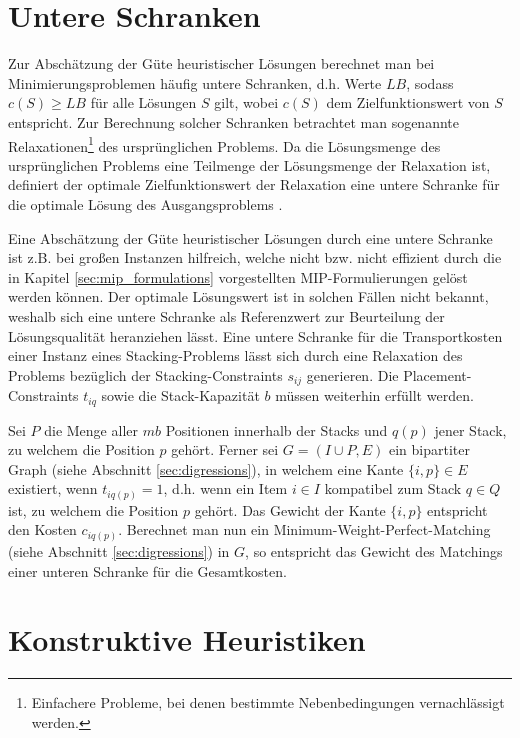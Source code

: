 \section{Untere Schranken}
\label{sec:lower_bounds}

Zur Abschätzung der Güte heuristischer Lösungen berechnet man bei Minimierungsproblemen häufig untere Schranken,
d.h. Werte $LB$, sodass $c(S) \geq LB$ für alle Lösungen $S$ gilt, wobei $c(S)$ dem Zielfunktionswert von $S$ entspricht.
Zur Berechnung solcher Schranken betrachtet man sogenannte Relaxationen\footnote{Einfachere Probleme, bei denen bestimmte Nebenbedingungen vernachlässigt werden.} des ursprünglichen Problems.
Da die Lösungsmenge des ursprünglichen Problems eine Teilmenge der Lösungsmenge der Relaxation ist,
definiert der optimale Zielfunktionswert der Relaxation eine untere Schranke für die optimale Lösung des Ausgangsproblems
\cite{Knust2017}.

Eine Abschätzung der Güte heuristischer Lösungen durch eine untere Schranke ist z.B. bei großen Instanzen hilfreich,
welche nicht bzw. nicht effizient durch die in Kapitel \ref{sec:mip_formulations} vorgestellten MIP-Formulierungen gelöst werden können.
Der optimale Lösungswert ist in solchen Fällen nicht bekannt, weshalb sich eine untere Schranke als Referenzwert
zur Beurteilung der Lösungsqualität heranziehen lässt. Eine untere Schranke für die Transportkosten einer Instanz eines Stacking-Problems lässt sich durch eine Relaxation des Problems bezüglich der Stacking-Constraints $s_{ij}$ generieren.
Die Placement-Constraints $t_{iq}$ sowie die Stack-Kapazität $b$ müssen weiterhin erfüllt werden.

Sei $P$ die Menge aller $mb$ Positionen innerhalb der Stacks und $q(p)$ jener Stack, zu welchem die Position $p$ gehört.
Ferner sei $G = (I \cup P, E)$ ein bipartiter Graph (siehe Abschnitt \ref{sec:digressions}), in welchem eine Kante $\{i, p\} \in E$ existiert, wenn $t_{iq(p)} = 1$, d.h. wenn ein Item $i \in I$ kompatibel zum Stack $q \in Q$ ist, zu welchem die Position $p$ gehört. Das Gewicht der Kante $\{i, p\}$ entspricht den Kosten $c_{iq(p)}$. Berechnet man nun ein
Minimum-Weight-Perfect-Matching (siehe Abschnitt \ref{sec:digressions}) in $G$, so entspricht das Gewicht des Matchings einer unteren Schranke für die Gesamtkosten.

\section{Konstruktive Heuristiken}
\label{sec:constructive_heuristics}

